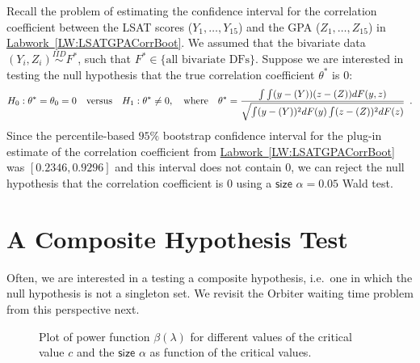 \begin{example}
Recall the problem of estimating the confidence interval for the correlation coefficient between the LSAT scores ($Y_1,\ldots,Y_{15}$) and the GPA ($Z_1,\ldots,Z_{15}$) in \hyperref[LW:LSATGPACorrBoot]{Labwork~\ref*{LW:LSATGPACorrBoot}}.  We assumed that the bivariate data $(Y_i,Z_i) \overset{IID}{\sim} F^*$, such that $F^* \in \{ \text{all bivariate DFs} \}$. Suppose we are interested in testing the null hypothesis that the true correlation coefficient $\theta^*$ is $0$:
\[
H_0: \theta^* = \theta_0 = 0 \quad \text{versus} \quad H_1: \theta^* \neq 0, \quad \text{where} \quad  \theta^* = \frac{\int \int (y-\mathscr{(}Y))(z-\mathscr{(}Z))dF(y,z)}{\sqrt{\int (y-\mathscr{(}Y))^2 dF(y) \int (z-\mathscr{(}Z))^2 dF(z)}} \enspace .
\]
Since the percentile-based $95\%$ bootstrap confidence interval for the plug-in estimate of the correlation coefficient from \hyperref[LW:LSATGPACorrBoot]{Labwork~\ref*{LW:LSATGPACorrBoot}} was $[0.2346, 0.9296]$ and this interval does not contain $0$, we can reject the null hypothesis that the correlation coefficient is $0$ using a $\mathsf{size}$ $\alpha=0.05$ Wald test.
\end{example}

\section{A Composite Hypothesis Test}
Often, we are interested in a testing a composite hypothesis, i.e.~one in which  the null hypothesis is not a singleton set.  We revisit the Orbiter waiting time problem from this perspective next.
\begin{figure}[htpb]
\caption{Plot of power function $\beta(\lambda)$ for different values of the critical value $c$ and the $\mathsf{size}$ $\alpha$ as function of the critical values.
\label{F:ExponentialTestOrbiter}}
\centering   {}
\end{figure}

